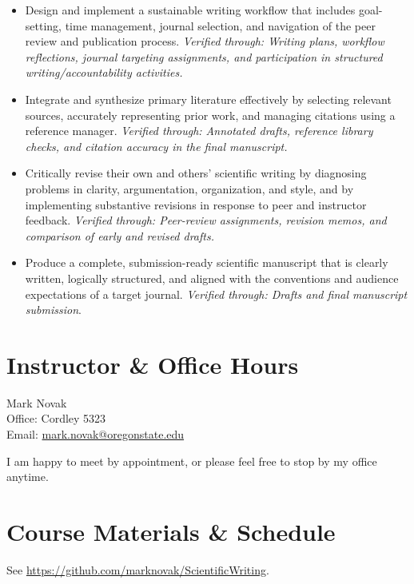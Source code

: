 \documentclass[10pt]{article}
\begin{document}
\begin{itemize}[leftmargin=*]
	
	\item
	Design and implement a sustainable writing workflow that includes goal-setting, time 
	management, journal selection, and navigation of the peer review and publication process.
	\textit{Verified through: Writing plans, workflow reflections, journal targeting assignments, and 
	participation in structured writing/accountability activities.}
	
	\item
	Integrate and synthesize primary literature effectively by selecting relevant sources, accurately 
	representing prior work, and managing citations using a reference manager.
	\textit{Verified through: Annotated drafts, reference library checks, and citation accuracy in the 
	final manuscript.}
	
	\item
	Critically revise their own and others’ scientific writing by diagnosing problems in clarity, 
	argumentation, organization, and style, and by implementing substantive revisions in response to 
	peer and instructor feedback.
	\textit{Verified through: Peer-review assignments, revision memos, and comparison of early and 
	revised drafts.}
	
	\item 
	Produce a complete, submission-ready scientific manuscript that is clearly written, logically 
	structured, and aligned with the conventions and audience expectations of a target journal.
	\textit{Verified through: Drafts and final manuscript submission}.

\end{itemize}

\section*{Instructor \& Office Hours}
	\noindent
	Mark Novak\\
	Office: Cordley 5323\\
	Email: \href{mailto:mark.novak@oregonstate.edu}{mark.novak@oregonstate.edu}

\noindent
	I am happy to meet by appointment, or please feel free to stop by my office 
	anytime.

\section*{Course Materials \& Schedule}
\noindent
See
\href{https://github.com/marknovak/ScientificWriting}{https://github.com/marknovak/ScientificWriting}.
 
\end{document}
